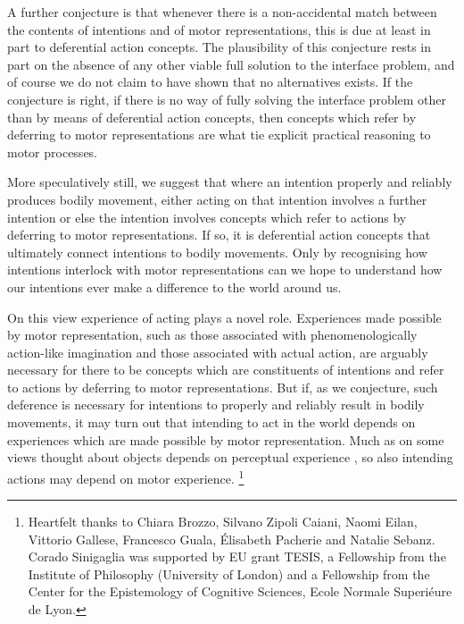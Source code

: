 \documentclass[12pt,\papersize]{extarticle}
\begin{document}
A further conjecture is that whenever there is a non-accidental match between the contents of intentions and of motor representations, this is due at least in part to deferential action concepts. The plausibility of this conjecture rests in part on the absence of any other viable full solution to the interface problem, and of course we do not claim to have shown that no alternatives exists. If the conjecture is right, if there is no way of fully solving the interface problem other than by means of deferential action concepts, then concepts which refer by deferring to motor representations are what tie explicit practical reasoning to motor processes.

More speculatively still, we suggest that where an intention properly and reliably produces bodily movement, either acting on that intention involves a further intention or else the intention involves concepts which refer to actions by deferring to motor representations. If so, it is deferential action concepts that ultimately connect intentions to bodily movements. Only by recognising how intentions interlock with motor representations can we hope to understand how our intentions ever make a difference to the world around us.

On this view experience of acting plays a novel role. Experiences made possible by motor representation, such as those associated with phenomenologically action-like imagination and those associated with actual action, are arguably necessary for there to be concepts which are constituents of intentions and refer to actions by deferring to motor representations. But if, as we conjecture, such deference is necessary for intentions to properly and reliably result in bodily movements, it may turn out that intending to act in the world depends on experiences which are made possible by motor representation. Much as on some views thought about objects depends on perceptual experience \citep[e.g.][]{Campbell:2002ge}, so also intending actions may depend on motor experience.%
\footnote{
Heartfelt thanks to Chiara Brozzo, Silvano Zipoli Caiani, Naomi Eilan, Vittorio Gallese, Francesco Guala, \'Elisabeth Pacherie and Natalie Sebanz.  Corado Sinigaglia was supported by EU grant TESIS, a Fellowship from the Institute of Philosophy (University of London) and a Fellowship from the Center for the Epistemology of Cognitive Sciences, Ecole Normale Superiéure de Lyon.
}  







\end{document}
